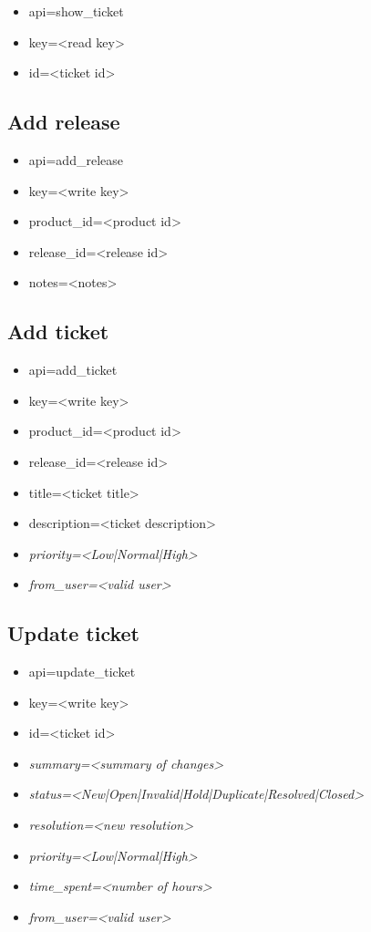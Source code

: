 \documentclass[11pt]{article}
\begin{document}
\begin{itemize}
\item api=show\_ticket
\item key=<read key>
\item id=<ticket id>
\end{itemize}

\subsection{Add release}

\begin{itemize}
\item api=add\_release
\item key=<write key>
\item product\_id=<product id>
\item release\_id=<release id>
\item notes=<notes>
\end{itemize}

\subsection{Add ticket}

\begin{itemize}
\item api=add\_ticket
\item key=<write key>
\item product\_id=<product id>
\item release\_id=<release id>
\item title=<ticket title>
\item description=<ticket description>
\item \textit{priority=<Low|Normal|High>}
\item \textit{from\_user=<valid user>}
\end{itemize}

\subsection{Update ticket}

\begin{itemize}
\item api=update\_ticket
\item key=<write key>
\item id=<ticket id>
\item \textit{summary=<summary of changes>}
\item \textit{status=<New|Open|Invalid|Hold|Duplicate|Resolved|Closed>}
\item \textit{resolution=<new resolution>}
\item \textit{priority=<Low|Normal|High>}
\item \textit{time\_spent=<number of hours>}
\item \textit{from\_user=<valid user>}
\end{itemize}
\end{document}
